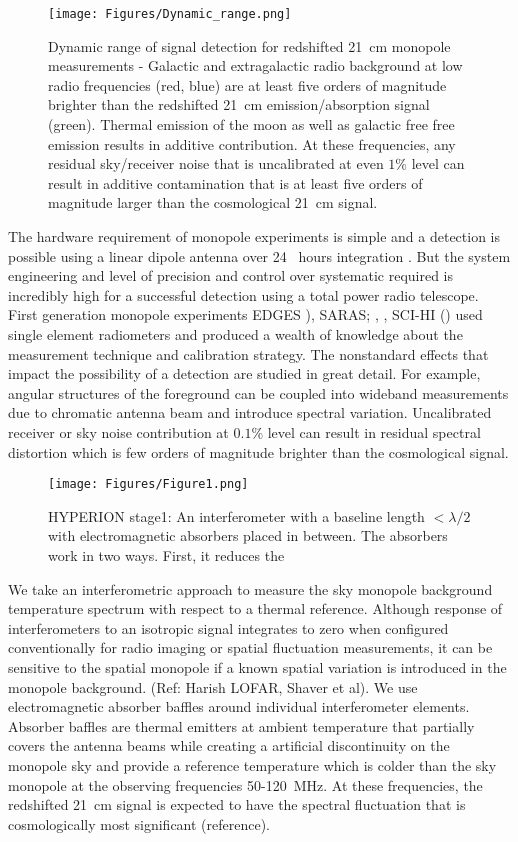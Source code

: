 \documentclass[12pt]{amsart}
\begin{document}
\begin{figure}[!ht]
\centering
\texttt{[image: Figures/Dynamic\_range.png]}
\caption{\small
Dynamic range of signal detection for redshifted 21~cm monopole measurements - Galactic and extragalactic radio background at low radio frequencies (red, blue) are at least five orders of magnitude brighter than the redshifted 21~cm emission/absorption signal (green). Thermal emission of the moon as well as galactic free free emission results in additive contribution. At these frequencies, any residual sky/receiver noise that is uncalibrated at even $1\%$ level can result in additive contamination that is at least five orders of magnitude larger than the cosmological 21~cm signal.
}
\label{figure2}
\end{figure}
The hardware requirement of monopole experiments is simple and a detection is possible using a linear dipole antenna over 24 ~hours integration \cite{Shaver99}. But the system engineering and level of precision and
control over systematic required is incredibly high for a successful detection using a total power radio telescope.
First generation monopole experiments EDGES \cite{Bowman_Roger2010}), SARAS; \cite{Patra13}, \cite{Patra15b} , SCI-HI (\cite{Voytek2015}) used single element radiometers and produced a wealth of knowledge about the measurement technique and calibration strategy. The nonstandard effects that impact the possibility of a detection are studied in great detail. For example, angular structures of the foreground can be coupled into wideband measurements due to chromatic antenna beam and introduce spectral variation. Uncalibrated receiver or sky noise contribution at $0.1\%$ level can result in residual spectral distortion which is few orders of magnitude brighter than the cosmological signal. 

\begin{figure}[!ht]
\centering
\texttt{[image: Figures/Figure1.png]}
 \caption{\small
HYPERION stage1: An interferometer with a baseline length $< \lambda/2$ with electromagnetic absorbers placed in between. The absorbers work in two ways. First, it reduces the 
}
\label{figure3}
\end{figure}
We take an interferometric approach to measure the sky monopole background temperature spectrum with respect to a thermal reference.
Although response of interferometers to an isotropic signal integrates to zero when configured conventionally for radio imaging or spatial fluctuation measurements, it can be sensitive to the spatial monopole if a known spatial variation is introduced in the monopole background. (Ref: Harish LOFAR, Shaver et al). We use electromagnetic absorber baffles around individual interferometer elements. Absorber baffles are thermal emitters at ambient temperature that partially covers the antenna beams while creating a artificial discontinuity on the monopole sky and provide a reference temperature which is colder than the sky monopole at the observing frequencies 50-120~MHz. At these frequencies, the redshifted 21~cm signal is expected to have the spectral fluctuation that is cosmologically most significant (reference).
\end{document}
